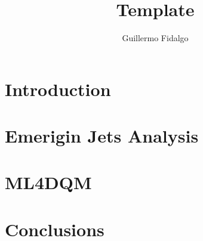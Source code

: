 \documentclass{beamer}
\title{Template}
\author[GAFR]{Guillermo Fidalgo}
\institute[UPRM]{University of Puerto Rico - Mayagüez}
\begin{document}
\maketitle

\section{Introduction}

\section{Emerigin Jets Analysis}


\section{ML4DQM}


\section{Conclusions}
\end{document}
